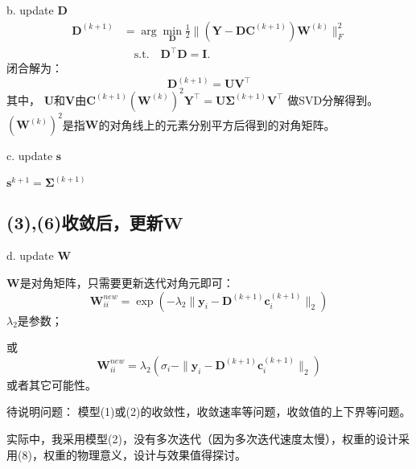 \documentclass[10pt,twocolumn,letterpaper]{article}
\begin{document}
b. update $\mathbf{D}$
\begin{equation}
\begin{split}
\mathbf{D}^{(k+1)}
&
=
\arg\min_{\mathbf{D}}\frac{1}{2}\|(\mathbf{Y}-\mathbf{D}\mathbf{C}^{(k+1)})\mathbf{W}^{(k)}\|_{F}^{2}
\\
&
\quad
\text{s.t.}
\quad
\mathbf{D}^{\top}\mathbf{D} =\mathbf{I}. 
\end{split}
\end{equation}
闭合解为：
\begin{equation}
\mathbf{D}^{(k+1)}
=
\mathbf{U}\mathbf{V}^{\top}
\end{equation}
其中，
$\mathbf{U}$和$\mathbf{V}$由$\mathbf{C}^{(k+1)}(\mathbf{W}^{(k)})^{2}\mathbf{Y}^{\top}=\mathbf{U}\mathbf{\Sigma}^{(k+1)}\mathbf{V}^{\top}
$
做SVD分解得到。$(\mathbf{W}^{(k)})^{2}$是指$\mathbf{W}$的对角线上的元素分别平方后得到的对角矩阵。

c. update $\mathbf{s}$

$\mathbf{s}^{k+1}=\mathbf{\Sigma}^{(k+1)}$

\subsection{(3),(6)收敛后，更新$\mathbf{W}$}
d. update $\mathbf{W}$

$\mathbf{W}$是对角矩阵，只需要更新迭代对角元即可：
\begin{equation}
\mathbf{W}_{ii}^{new}=\exp(-\lambda_{2}\|\mathbf{y}_{i}-\mathbf{D}^{(k+1)}\mathbf{c}_{i}^{(k+1)}\|_{2})
\end{equation}
$\lambda_{2}$是参数；

或
\begin{equation}
\mathbf{W}_{ii}^{new}=\lambda_{2}(\sigma_{i}-\|\mathbf{y}_{i}-\mathbf{D}^{(k+1)}\mathbf{c}_{i}^{(k+1)}\|_{2})
\end{equation}
或者其它可能性。

待说明问题：
模型(1)或(2)的收敛性，收敛速率等问题，收敛值的上下界等问题。

实际中，我采用模型(2)，没有多次迭代（因为多次迭代速度太慢），权重的设计采用(8)，权重的物理意义，设计与效果值得探讨。





{\small


}
\end{document}

